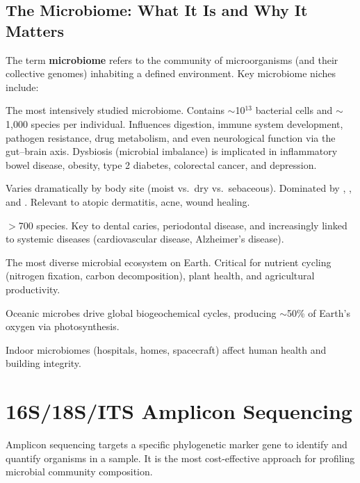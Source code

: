 \subsection{The Microbiome: What It Is and Why It Matters}

The term \textbf{microbiome} refers to the community of microorganisms (and their collective genomes) inhabiting a defined environment. Key microbiome niches include:

\begin{description}[style=nextline]
  \item[Human gut microbiome] The most intensively studied microbiome. Contains $\sim$10$^{13}$ bacterial cells and $\sim$1,000 species per individual. Influences digestion, immune system development, pathogen resistance, drug metabolism, and even neurological function via the gut--brain axis. Dysbiosis (microbial imbalance) is implicated in inflammatory bowel disease, obesity, type 2 diabetes, colorectal cancer, and depression.
  \item[Human skin microbiome] Varies dramatically by body site (moist vs.\ dry vs.\ sebaceous). Dominated by , , and . Relevant to atopic dermatitis, acne, wound healing.
  \item[Human oral microbiome] $>$700 species. Key to dental caries, periodontal disease, and increasingly linked to systemic diseases (cardiovascular disease, Alzheimer's disease).
  \item[Soil microbiome] The most diverse microbial ecosystem on Earth. Critical for nutrient cycling (nitrogen fixation, carbon decomposition), plant health, and agricultural productivity.
  \item[Marine microbiome] Oceanic microbes drive global biogeochemical cycles, producing $\sim$50\% of Earth's oxygen via photosynthesis.
  \item[Built environment] Indoor microbiomes (hospitals, homes, spacecraft) affect human health and building integrity.
\end{description}

\section{16S/18S/ITS Amplicon Sequencing}
\label{sec:amplicon}

Amplicon sequencing targets a specific phylogenetic marker gene to identify and quantify organisms in a sample. It is the most cost-effective approach for profiling microbial community composition.

